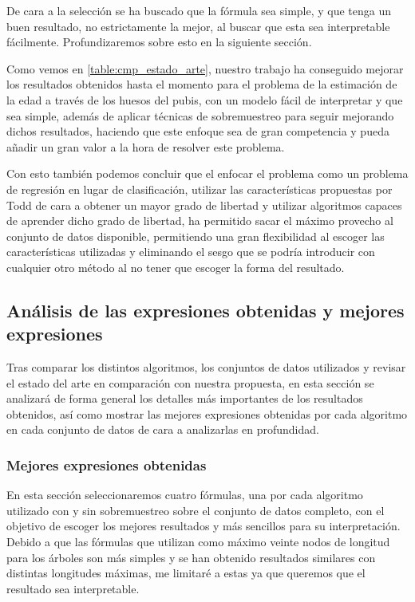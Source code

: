 De cara a la selección se ha buscado que la fórmula sea simple, y que tenga un buen resultado, no estrictamente la mejor, al buscar que esta sea interpretable fácilmente. Profundizaremos sobre esto en la siguiente sección.

Como vemos en \ref{table:cmp_estado_arte}, nuestro trabajo ha conseguido mejorar los resultados obtenidos hasta el momento para el problema de la estimación de la edad a través de los huesos del pubis, con un modelo fácil de interpretar y que sea simple, además de aplicar técnicas de sobremuestreo para seguir mejorando dichos resultados, haciendo que este enfoque sea de gran competencia y pueda añadir un gran valor a la hora de resolver este problema.

Con esto también podemos concluir que el enfocar el problema como un problema de regresión en lugar de clasificación, utilizar las características propuestas por Todd de cara a obtener un mayor grado de libertad y utilizar algoritmos capaces de aprender dicho grado de libertad, ha permitido sacar el máximo provecho al conjunto de datos disponible, permitiendo una gran flexibilidad al escoger las características utilizadas y eliminando el sesgo que se podría introducir con cualquier otro método al no tener que escoger la forma del resultado.


\subsection{Análisis de las expresiones obtenidas y mejores expresiones}


Tras comparar los distintos algoritmos, los conjuntos de datos utilizados y revisar el estado del arte en comparación con nuestra propuesta, en esta sección se analizará de forma general los detalles más importantes de los resultados obtenidos, así como mostrar las mejores expresiones obtenidas por cada algoritmo en cada conjunto de datos de cara a analizarlas en profundidad.

\subsubsection{Mejores expresiones obtenidas}

En esta sección seleccionaremos cuatro fórmulas, una por cada algoritmo utilizado con y sin sobremuestreo sobre el conjunto de datos completo, con el objetivo de escoger los mejores resultados y más sencillos para su interpretación. Debido a que las fórmulas que utilizan como máximo veinte nodos de longitud para los árboles son más simples y se han obtenido resultados similares con distintas longitudes máximas, me limitaré a estas ya que queremos que el resultado sea interpretable.

